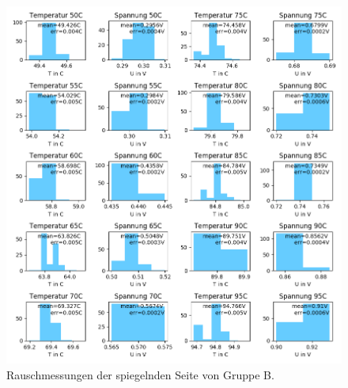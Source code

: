 \documentclass[12pt,a4paper]{article}
\begin{document}
\begin{figure}[H]
\includegraphics[scale=0.8]{Bilder/Rauschen_B_spiegel_2.png}
\caption{Rauschmessungen der spiegelnden Seite von Gruppe B.}
\end{figure}
\end{document}
